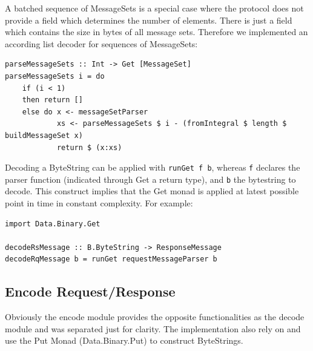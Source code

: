 


A batched sequence of MessageSets is a special case where the protocol does not provide a
field which determines the number of elements. There is just a field which contains
the size in bytes of all message sets. Therefore we implemented an according
list decoder for sequences of MessageSets:
\begin{lstlisting}
parseMessageSets :: Int -> Get [MessageSet]
parseMessageSets i = do
    if (i < 1)
    then return []
    else do x <- messageSetParser
            xs <- parseMessageSets $ i - (fromIntegral $ length $ buildMessageSet x)
            return $ (x:xs) 
\end{lstlisting}

Decoding a ByteString can be applied with \lstinline{runGet f b}, whereas
\lstinline{f} declares the parser function (indicated through Get a return type),
and  \lstinline{b} the bytestring to decode. This construct implies that the Get
monad is applied at latest possible point in time in constant complexity. For example: 
\begin{lstlisting}
import Data.Binary.Get

decodeRsMessage :: B.ByteString -> ResponseMessage
decodeRqMessage b = runGet requestMessageParser b

\end{lstlisting}


\subsection{Encode Request/Response}
Obviously the encode module provides the opposite functionalities as the decode
module and was separated just for clarity. The implementation also rely on
and use the Put Monad (Data.Binary.Put) to construct ByteStrings.

